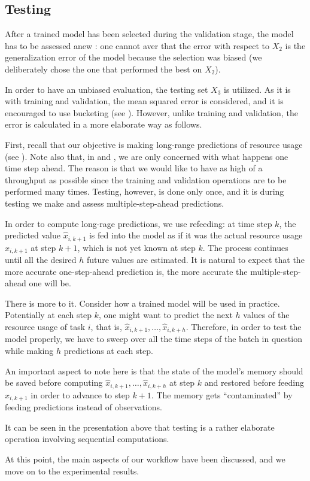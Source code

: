 \subsection{Testing}
After a trained model has been selected during the validation stage, the model
has to be assessed anew \cite{hastie2009}: one cannot aver that the error with
respect to $X_2$ is the generalization error of the model because the selection
was biased (we deliberately chose the one that performed the best on $X_2$).

In order to have an unbiased evaluation, the testing set $X_3$ is utilized. As
it is with training and validation, the mean squared error is considered, and it
is encouraged to use bucketing (see ). However, unlike training
and validation, the error is calculated in a more elaborate way as follows.

First, recall that our objective is making long-range predictions of resource
usage (see ). Note also that, in  and
, we are only concerned with what happens one time step ahead.
The reason is that we would like to have as high of a throughput as possible
since the training and validation operations are to be performed many times.
Testing, however, is done only once, and it is during testing we make and assess
multiple-step-ahead predictions.

In order to compute long-rage predictions, we use refeeding: at time step $k$,
the predicted value $\hat{x}_{i,k + 1}$ is fed into the model as if it was the
actual resource usage $x_{i,k + 1}$ at step $k + 1$, which is not yet known at
step $k$. The process continues until all the desired $h$ future values are
estimated. It is natural to expect that the more accurate one-step-ahead
prediction is, the more accurate the multiple-step-ahead one will be.

There is more to it. Consider how a trained model will be used in practice.
Potentially at each step $k$, one might want to predict the next $h$ values of
the resource usage of task $i$, that is, $\hat{x}_{i,k + 1}, \dots, \hat{x}_{i,k
+ h}$. Therefore, in order to test the model properly, we have to sweep over all
the time steps of the batch in question while making $h$ predictions at each
step.

An important aspect to note here is that the state of the model's memory should
be saved before computing $\hat{x}_{i,k + 1}, \dots, \hat{x}_{i,k + h}$ at step
$k$ and restored before feeding $x_{i,k + 1}$ in order to advance to step $k +
1$. The memory gets ``contaminated'' by feeding predictions instead of
observations.

It can be seen in the presentation above that testing is a rather elaborate
operation involving sequential computations.

At this point, the main aspects of our workflow have been discussed, and we move
on to the experimental results.
